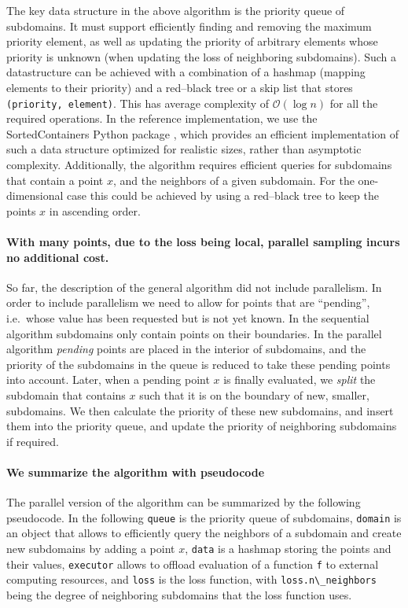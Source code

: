 \documentclass[english, twocolumn, 10pt, aps, superscriptaddress, floatfix, prb, citeautoscript]{revtex4-1}
\renewcommand{\citep}{\cite}
\newcommand{\passthrough}[1]{\lstset{mathescape=false}#1\lstset{mathescape=true}}
\begin{document}
The key data structure in the above algorithm is the priority queue of subdomains.
It must support efficiently finding and removing the maximum priority element, as well as updating the priority of arbitrary elements whose priority is unknown (when updating the loss of neighboring subdomains).
Such a datastructure can be achieved with a combination of a hashmap (mapping elements to their priority) and a red--black tree or a skip list \citep{Cormen2009} that stores \passthrough{\lstinline!(priority, element)!}.
This has average complexity of \(\mathcal{O}(\log{n})\) for all the required operations.
In the reference implementation, we use the SortedContainers Python package \citep{Jenks2014}, which provides an efficient implementation of such a data structure optimized for realistic sizes, rather than asymptotic complexity.
Additionally, the algorithm requires efficient queries for subdomains that contain a point \(x\), and the neighbors of a given subdomain.
For the one-dimensional case this could be achieved by using a red--black tree to keep the points \(x\) in ascending order.

\paragraph{With many points, due to the loss being local, parallel sampling incurs no additional cost.}

So far, the description of the general algorithm did not include parallelism.
In order to include parallelism we need to allow for points that are ``pending'', i.e.~whose value has been requested but is not yet known.
In the sequential algorithm subdomains only contain points on their boundaries.
In the parallel algorithm \emph{pending} points are placed in the interior of subdomains, and the priority of the subdomains in the queue is reduced to take these pending points into account.
Later, when a pending point \(x\) is finally evaluated, we \emph{split} the subdomain that contains \(x\) such that it is on the boundary of new, smaller, subdomains.
We then calculate the priority of these new subdomains, and insert them into the priority queue, and update the priority of neighboring subdomains if required.

\paragraph{We summarize the algorithm with pseudocode}

The parallel version of the algorithm can be summarized by the following pseudocode.
In the following \passthrough{\lstinline!queue!} is the priority queue of subdomains, \passthrough{\lstinline!domain!} is an object that allows to efficiently query the neighbors of a subdomain and create new subdomains by adding a point \(x\), \passthrough{\lstinline!data!} is a hashmap storing the points and their values, \passthrough{\lstinline!executor!} allows to offload evaluation of a function \passthrough{\lstinline!f!} to external computing resources, and \passthrough{\lstinline!loss!} is the loss function, with \passthrough{\lstinline!loss.n\_neighbors!} being the degree of neighboring subdomains that the loss function uses.
\end{document}
